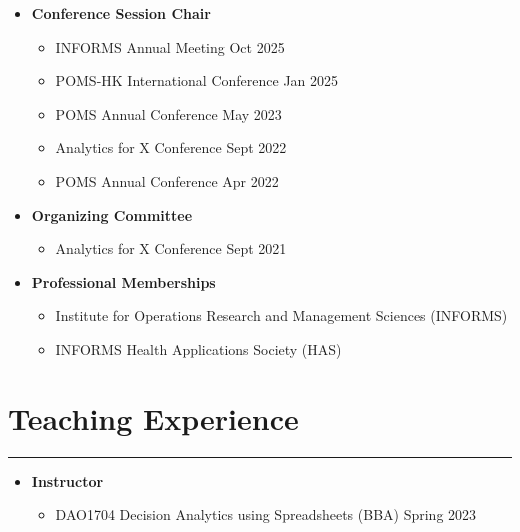 \documentclass[12pt, a4paper]{article}
\begin{document}
{\begin{itemize}[leftmargin=16pt]
	\item[] \textbf{Conference Session Chair}
	\begin{itemize}[parsep=2pt, label=$\bullet$]
		\item INFORMS Annual Meeting \hfill Oct 2025
		\item POMS-HK International Conference \hfill Jan 2025
		\item POMS Annual Conference \hfill May 2023
		\item Analytics for X Conference \hfill Sept 2022
		\item POMS Annual Conference \hfill Apr 2022
	\end{itemize}

	\item[] \textbf{Organizing Committee}
	\begin{itemize}[parsep=2pt, label=$\bullet$]
		\item Analytics for X Conference \hfill Sept 2021
	\end{itemize}

	\item[] \textbf{Professional Memberships}
	\begin{itemize}[parsep=2pt, label=$\bullet$]
		\item Institute for Operations Research and Management Sciences (INFORMS)
		\item INFORMS Health Applications Society (HAS)
	\end{itemize}

\end{itemize}




\section*{Teaching Experience}
\vspace*{4pt}
\hrule

\begin{itemize}[leftmargin=16pt]
	\item[] \textbf{Instructor}
	\begin{itemize}[label=$\bullet$]
		\item DAO1704 Decision Analytics using Spreadsheets (BBA) \hfill Spring 2023
	\end{itemize}


\end{itemize}}
\end{document}
